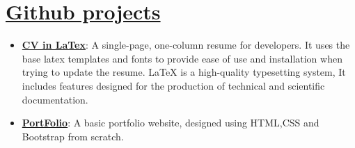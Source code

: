 \documentclass[letterpaper,12pt]{article}
\newcommand{\resumeItem}[2]{
  \item\small{
    \textbf{#1}{:#2 \vspace{-4pt}}
  }
}
\newcommand{\resumeSubItem}[2]{\resumeItem{#1}{#2}\vspace{-4pt}}
\newcommand{\resumeSubHeadingListStart}{\begin{itemize}[leftmargin=*]}
\newcommand{\resumeSubHeadingListEnd}{\end{itemize}}
\begin{document}
\section{\href{https://github.com/Neenju0075}{Github projects}}
  \resumeSubHeadingListStart
    \resumeSubItem {\href{https://github.com/Neenju0075/MyResume}{CV in LaTex}}
      { A single-page, one-column resume for developers. It uses the base latex templates and fonts to provide ease of use and installation when trying to update the resume. LaTeX is a high-quality typesetting system, It includes features designed for the production of technical and scientific documentation.}
    \resumeSubItem{\href{https://github.com/Neenju0075/My_portFolio}{PortFolio}}
    { A basic portfolio website, designed using HTML,CSS and Bootstrap from scratch.}
    \resumeSubHeadingListEnd
\end{document}
